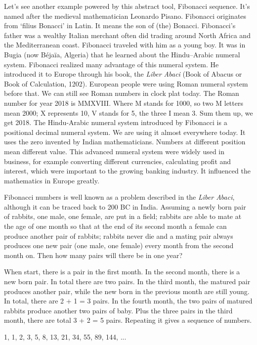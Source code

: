 \documentclass[UTF8]{article}
\begin{document}
Let's see another example powered by this abstract tool, Fibonacci sequence. It's named after the medieval mathematician Leonardo Pisano. Fibonacci originates from `filius Bonacci' in Latin. It means the son of (the) Bonacci. Fibonacci's father was a wealthy Italian merchant
 often did trading around North Africa and the Mediterranean coast. Fibonacci traveled with him as a young boy. It was in Bugia (now Béjaïa, Algeria) that he learned about the Hindu–Arabic numeral system. Fibonacci realized many advantage of this numeral system. He introduced it to Europe through his book, the {\em Liber Abaci} (Book of Abacus or Book of Calculation, 1202). European people were using Roman numeral system before that. We can still see Roman numbers in clock plat today. The Roman number for year 2018 is MMXVIII. Where M stands for 1000, so two M letters mean 2000; X represents 10, V stands for 5, the three I mean 3. Sum them up, we get 2018. The Hindu-Arabic numeral system introduced by Fibonacci is a positional decimal numeral system. We are using it almost everywhere today. It uses the zero invented by Indian mathematicians. Numbers at different position mean different value. This advanced numeral system were widely used in business, for example converting different currencies, calculating profit and interest, which were important to the growing banking industry. It influenced the mathematics in Europe greatly.

Fibonacci numbers is well known as a problem described in the {\em Liber Abaci}, although it can be traced back to 200 BC in India. Assuming a newly born pair of rabbits, one male, one female, are put in a field; rabbits are able to mate at the age of one month so that at the end of its second month a female can produce another pair of rabbits; rabbits never die and a mating pair always produces one new pair (one male, one female) every month from the second month on. Then how many pairs will there be in one year?

When start, there is a pair in the first month. In the second month, there is a new born pair. In total there are two pairs. In the third month, the matured pair produces another pair, while the new born in the previous month are still young. In total, there are 2 + 1 = 3 pairs. In the fourth month, the two pairs of matured rabbits produce another two pairs of baby. Plus the three pairs in the third month, there are total 3 + 2 = 5 pairs. Repeating it gives a sequence of numbers.

1, 1, 2, 3, 5, 8, 13, 21, 34, 55, 89, 144, ...
\end{document}
